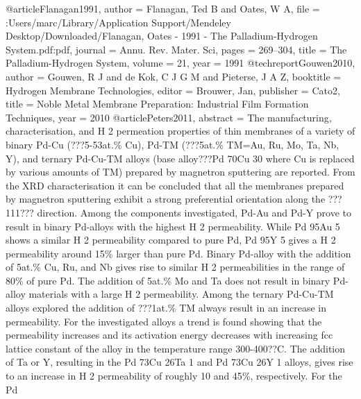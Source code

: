 @article{Flanagan1991,
author = {Flanagan, Ted B and Oates, W A},
file = {:Users/marc/Library/Application Support/Mendeley Desktop/Downloaded/Flanagan, Oates - 1991 - The Palladium-Hydrogen System.pdf:pdf},
journal = {Annu. Rev. Mater. Sci},
pages = {269--304},
title = {{The Palladium-Hydrogen System}},
volume = {21},
year = {1991}
}
@techreport{Gouwen2010,
author = {Gouwen, R J and de Kok, C J G M and Pieterse, J A Z},
booktitle = {Hydrogen Membrane Technologies},
editor = {Brouwer, Jan},
publisher = {Cato2},
title = {{Noble Metal Membrane Preparation: Industrial Film Formation Techniques}},
year = {2010}
}
@article{Peters2011,
abstract = {The manufacturing, characterisation, and H
                        2 permeation properties of thin membranes of a variety of binary Pd-Cu (???5-53at.{\%} Cu), Pd-TM (???5at.{\%} TM=Au, Ru, Mo, Ta, Nb, Y), and ternary Pd-Cu-TM alloys (base alloy???Pd
                        70Cu
                        30 where Cu is replaced by various amounts of TM) prepared by magnetron sputtering are reported. From the XRD characterisation it can be concluded that all the membranes prepared by magnetron sputtering exhibit a strong preferential orientation along the ???111??? direction. Among the components investigated, Pd-Au and Pd-Y prove to result in binary Pd-alloys with the highest H
                        2 permeability. While Pd
                        95Au
                        5 shows a similar H
                        2 permeability compared to pure Pd, Pd
                        95Y
                        5 gives a H
                        2 permeability around 15{\%} larger than pure Pd. Binary Pd-alloy with the addition of 5at.{\%} Cu, Ru, and Nb gives rise to similar H
                        2 permeabilities in the range of 80{\%} of pure Pd. The addition of 5at.{\%} Mo and Ta does not result in binary Pd-alloy materials with a large H
                        2 permeability. Among the ternary Pd-Cu-TM alloys explored the addition of ???1at.{\%} TM always result in an increase in permeability. For the investigated alloys a trend is found showing that the permeability increases and its activation energy decreases with increasing fcc lattice constant of the alloy in the temperature range 300-400??C. The addition of Ta or Y, resulting in the Pd
                        73Cu
                        26Ta
                        1 and Pd
                        73Cu
                        26Y
                        1 alloys, gives rise to an increase in H
                        2 permeability of roughly 10 and 45{\%}, respectively. For the Pd
}}
